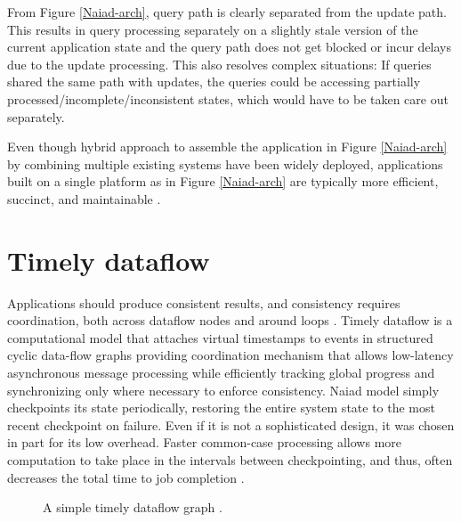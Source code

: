 \documentclass[9pt,twocolumn,twoside]{../../styles/osajnl}
\begin{document}
From Figure \ref{Naiad-arch}, query path is clearly separated from the
update path. This results in query processing separately on a slightly
stale version of the current application state and the query path does
not get blocked or incur delays due to the update processing. This
also resolves complex situations: If queries shared the same path with
updates, the queries could be accessing partially
processed/incomplete/inconsistent states, which would have to be taken
care out separately.

Even though hybrid approach to assemble the application in Figure
\ref{Naiad-arch} by combining multiple existing systems have been
widely deployed, applications built on a single platform as in Figure
\ref{Naiad-arch} are typically more efficient, succinct, and
maintainable \cite{paper1-Naiad}.

\section{Timely dataflow}
Applications should produce consistent results, and consistency
requires coordination, both across dataflow nodes and around loops
\cite{paper1-Naiad}. Timely dataflow is a computational model that
attaches virtual timestamps to events in structured cyclic data-flow
graphs providing coordination mechanism that allows low-latency
asynchronous message processing while efficiently tracking global
progress and synchronizing only where necessary to enforce
consistency. Naiad model simply checkpoints its state periodically,
restoring the entire system state to the most recent checkpoint on
failure. Even if it is not a sophisticated design, it was chosen in
part for its low overhead. Faster common-case processing allows more
computation to take place in the intervals between checkpointing, and
thus, often decreases the total time to job completion
\cite{paper3-Naiad}.

\begin{figure}[htbp]
\centering
{}
\caption{A simple timely dataflow graph \cite{paper1-Naiad}.}
\label{timely-dataflow-graph}
\end{figure}
\end{document}
